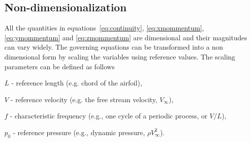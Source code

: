 \subsection{Non-dimensionalization}
All the quantities in equations~\ref{eq:continuity}, \ref{eq:xmommentum}, \ref{eq:ymommentum} and \ref{eq:zmommentum} are dimensional and their magnitudes can vary widely. The governing equations can be transformed into a non dimensional form by scaling the variables using reference values. The scaling parameters can be defined as follows
\begin{list}{}{}
	\item $L$ - reference length (e.g. chord of the airfoil),
	\item $V$ - reference velocity (e.g. the free stream velocity, $V_{\infty}$),
	\item $f$ - characteristic frequency (e.g., one cycle of a periodic process, or $V/L$),
	\item $p_0$ - reference pressure (e.g., dynamic pressure, $\rho V_{\infty}^2$).
\end{list}

